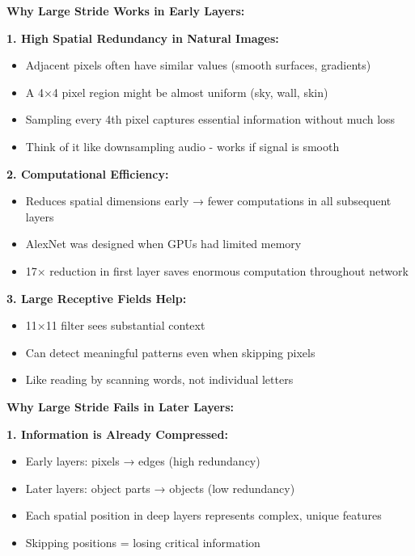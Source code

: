 \documentclass[12pt]{article}
\newcommand{\explanation}[1]{{\color{explanationcolor}#1}}
\begin{document}
\begin{enumerate}[(a)]
{    \textbf{Why Large Stride Works in Early Layers:}
    
    \explanation{
    \textbf{1. High Spatial Redundancy in Natural Images:}
    \begin{itemize}
        \item Adjacent pixels often have similar values (smooth surfaces, gradients)
        \item A 4×4 pixel region might be almost uniform (sky, wall, skin)
        \item Sampling every 4th pixel captures essential information without much loss
        \item Think of it like downsampling audio - works if signal is smooth
    \end{itemize}
    
    \textbf{2. Computational Efficiency:}
    \begin{itemize}
        \item Reduces spatial dimensions early → fewer computations in all subsequent layers
        \item AlexNet was designed when GPUs had limited memory
        \item 17× reduction in first layer saves enormous computation throughout network
    \end{itemize}
    
    \textbf{3. Large Receptive Fields Help:}
    \begin{itemize}
        \item 11×11 filter sees substantial context
        \item Can detect meaningful patterns even when skipping pixels
        \item Like reading by scanning words, not individual letters
    \end{itemize}
    }
    
    \textbf{Why Large Stride Fails in Later Layers:}
    
    \explanation{
    \textbf{1. Information is Already Compressed:}
    \begin{itemize}
        \item Early layers: pixels → edges (high redundancy)
        \item Later layers: object parts → objects (low redundancy)
        \item Each spatial position in deep layers represents complex, unique features
        \item Skipping positions = losing critical information
    \end{itemize}
    
}}
\end{enumerate}
\end{document}
